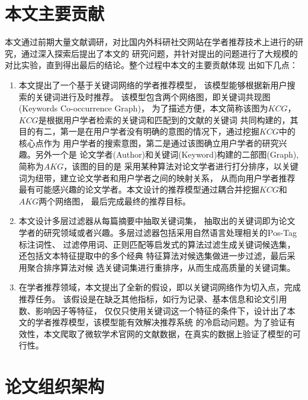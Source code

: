 \section{本文主要贡献}
本文通过前期大量文献调研，对比国内外科研社交网站在学者推荐技术上进行的研究，通过深入探索后提出了本文的%
研究问题，并针对提出的问题进行了大规模的对比实验，直到得出最后的结论。整个过程中本文的主要贡献体现%
出如下几点：
\begin{enumerate}
    \item 本文提出了一个基于关键词网络的学者推荐模型，%
          该模型能够根据新用户搜索的关键词进行及时推荐。%
          该模型包含两个网络图，即关键词共现图(Keywords Co-occurrence Graph)，%
          为了描述方便，本文简称该图为$KCG$，$KCG$是根据用户学者检索的关键词和匹配到的文献的关键词%
          共同构建的，其目的有二，第一是在用户学者没有明确的意图的情况下，通过挖掘$KCG$中的核心点作为%
          用户学者的搜索意图，第二是通过该图确立用户学者的研究兴趣。另外一个是
          论文学者(Author)和关键词(Keyword)构建的二部图(Graph),简称为$AKG$，该图的目的是%
          采用某种算法对论文学者进行打分排序，以关键词为纽带，建立论文学者和用户学者之间的映射关系，%
          从而向用户学者推荐最有可能感兴趣的论文学者。本文设计的推荐模型通过耦合并挖掘$KCG$和$AKG$两个网络图，%
          最后完成最终的推荐目标。
    \item 本文设计多层过滤器从每篇摘要中抽取关键词集，%
          抽取出的关键词即为论文学者的研究领域或者兴趣。多层过滤器包括采用自然语言处理相关的Pos-Tag标注词性、%
          过滤停用词、正则匹配等启发式的算法过滤生成关键词候选集，还包括文本特征提取中的多个经典%
          特征算法对候选集做进一步过滤，最后采用聚合排序算法对候%
          选关键词集进行重排序，从而生成高质量的关键词集。%
    \item 在学者推荐领域，本文提出了全新的假设，即以关键词网络作为切入点，完成推荐任务。%
          该假设是在缺乏其他指标，如行为记录、基本信息和论文引用数、影响因子等特征，%
          仅仅只使用关键词这一个特征的条件下，设计出了本文的学者推荐模型，该模型能有效解决推荐系统%
          的冷启动问题。为了验证有效性，本文爬取了微软学术官网的文献数据，在真实的数据上验证了模型的可行性。

\end{enumerate}


\section{论文组织架构}

